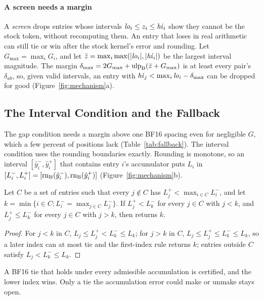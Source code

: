 \paragraph{A screen needs a margin} A \emph{screen} drops entries whose intervals $\mathit{lo}_i\le z_i\le \mathit{hi}_i$ show they cannot be the stock token, without recomputing them. An entry that loses in real arithmetic can still tie or win after the stock kernel's error and rounding. Let $G_{\max}=\max_iG_i$, and let $\bar z=\max_i\max(|\mathit{lo}_i|,|\mathit{hi}_i|)$ be the largest interval magnitude. The margin $\delta_{\max}=2G_{\max}+\operatorname{ulp}_{\mathrm{B}}(\bar z+G_{\max})$ is at least every pair's $\delta_{ab}$, so, given valid intervals, an entry with $\mathit{hi}_j<\max_i\mathit{lo}_i-\delta_{\max}$ can be dropped for good (Figure~\ref{fig:mechanism}a).

\subsection{The Interval Condition and the Fallback}\label{sec:kernel-fallback}
The gap condition needs a margin above one BF16 spacing even for negligible $G$, which a few percent of positions lack (Table~\ref{tab:fallback}). The interval condition uses the rounding boundaries exactly. Rounding is monotone, so an interval $[\hat y_i^-,\hat y_i^+]$ that contains entry $i$'s accumulator puts $L_i$ in $[L_i^-,L_i^+]=[\operatorname{rn}_{\mathrm{B}}(\hat y_i^-),\operatorname{rn}_{\mathrm{B}}(\hat y_i^+)]$ (Figure~\ref{fig:mechanism}b).

\begin{proposition}\label{prop:stockinterval}
Let $C$ be a set of entries such that every $j\notin C$ has $L_j^+<\max_{i\in C}L_i^-$, and let $k=\min\{i\in C:L_i^-=\max_{j\in C}L_j^-\}$. If $L_j^+<L_k^-$ for every $j\in C$ with $j<k$, and $L_j^+\le L_k^-$ for every $j\in C$ with $j>k$, then \Rstock{} returns $k$.
\end{proposition}
\begin{proof}
For $j<k$ in $C$, $L_j\le L_j^+<L_k^-\le L_k$; for $j>k$ in $C$, $L_j\le L_j^+\le L_k^-\le L_k$, so a later index can at most tie and the first-index rule returns $k$; entries outside $C$ satisfy $L_j<L_k^-\le L_k$.
\end{proof}
A BF16 tie that holds under every admissible accumulation is certified, and the lower index wins. Only a tie the accumulation error could make or unmake stays open.

